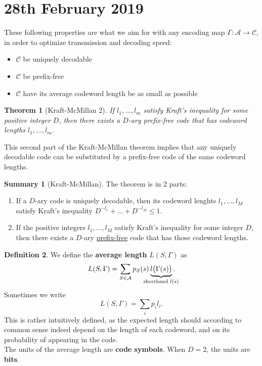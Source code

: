 \documentclass{report}
\theoremstyle{plain}
\newtheorem{thm}{Theorem}
\theoremstyle{definition}
\newtheorem{defn}[thm]{Definition}
\newtheorem*{summary}{Summary}
\theoremstyle{remark}
\begin{document}
\section{28th February 2019}

These following properties are what we aim for with any encoding map $\Gamma : \mathcal A \to \mathcal C$, in order to optimize transmission and decoding speed:
\begin{itemize}
	\item $\mathcal C$ be uniquely decodable
	\item $\mathcal C$ be prefix-free
	\item $\mathcal C$ have its average codeword length be as small as possible
\end{itemize}

\begin{thm}[Kraft-McMillan 2]
If $l_1, \ldots, l_m$ satisfy Kraft's inequality for some positive integer $D$, then there exists a $D$-ary prefix-free code that has codeword  lengths $l_1, \ldots, l_m$.
\end{thm}

This second part of the Kraft-McMillan theorem implies that any uniquely decodable code can be substituted by a prefix-free code of the same codeword lengths.
\begin{summary}[Kraft-McMillan] The theorem is in 2 parts:
	\begin{enumerate}
		\item If a $D$-ary code is uniquely decodable, then its codeword lenghts $l_1, \ldots, l_M$ satisfy Kraft's inequality $D^{-l_1} + \dots + D^{-l_M} \leq 1$.
		\item If the positive integers $l_1, \ldots, l_M$ satisfy Kraft's inequality for some integer $D$, then there exists a $D$-ary \ul{prefix-free} code that has those codeword lengths.
	\end{enumerate}
\end{summary}

\begin{defn}
We define the \textbf{average length} $L(S, \Gamma)$ as
	\begin{equation}
		L(S, \Gamma) = \sum_{S \in \mathcal A} p_S(s) \underbrace{l \bigl(\Gamma(s)\bigr)}_{{\mathclap{\text{shorthand } l(s)}}}.
	\end{equation}
	Sometimes we write
	\begin{equation}
		L(S, \Gamma) = \sum_i p_i l_i.
	\end{equation}
This is rather intuitively defined, as the expected length should according to common sense indeed depend on the length of each codeword, and on its probability of appearing in the code. \\
The units of the average length are \textbf{code symbols}. When $D = 2$, the units are \textbf{bits}.
\end{defn}
\end{document}
